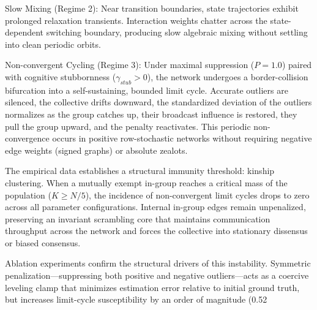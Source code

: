 Slow Mixing (Regime 2): Near transition boundaries, state trajectories exhibit prolonged relaxation transients\cite{degroot1974reaching,acemoglu2013opinion}. Interaction weights chatter across the state-dependent switching boundary, producing slow algebraic mixing without settling into clean periodic orbits\cite{acemoglu2013opinion,hajnal1958weak}.

Non-convergent Cycling (Regime 3): Under maximal suppression ($P = 1.0$) paired with cognitive stubbornness ($\gamma_{stub} > 0$), the network undergoes a border-collision bifurcation into a self-sustaining, bounded limit cycle\cite{degroot1974reaching,acemoglu2013opinion,hajnal1958weak}. Accurate outliers are silenced, the collective drifts downward, the standardized deviation of the outliers normalizes as the group catches up, their broadcast influence is restored, they pull the group upward, and the penalty reactivates\cite{degroot1974reaching}. This periodic non-convergence occurs in positive row-stochastic networks without requiring negative edge weights (signed graphs) or absolute zealots\cite{acemoglu2013opinion,hajnal1958weak}.

The empirical data establishes a structural immunity threshold: kinship clustering\cite{degroot1974reaching}. When a mutually exempt in-group reaches a critical mass of the population ($K \ge N/5$), the incidence of non-convergent limit cycles drops to zero across all parameter configurations\cite{degroot1974reaching,acemoglu2013opinion}. Internal in-group edges remain unpenalized, preserving an invariant scrambling core that maintains communication throughput across the network and forces the collective into stationary dissensus or biased consensus\cite{degroot1974reaching,acemoglu2013opinion,hajnal1958weak}.

Ablation experiments confirm the structural drivers of this instability\cite{degroot1974reaching}. Symmetric penalization—suppressing both positive and negative outliers—acts as a coercive leveling clamp that minimizes estimation error relative to initial ground truth, but increases limit-cycle susceptibility by an order of magnitude (0.52%

